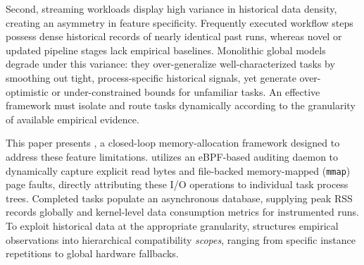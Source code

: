  


Second, streaming workloads display high variance in historical data density, creating an asymmetry in feature specificity. Frequently executed workflow steps possess dense historical records of nearly identical past runs, whereas novel or updated pipeline stages lack empirical baselines. Monolithic global models degrade under this variance: they over-generalize well-characterized tasks by smoothing out tight, process-specific historical signals, yet generate over-optimistic or under-constrained bounds for unfamiliar tasks. An effective framework must isolate and route tasks dynamically according to the granularity of available empirical evidence.

This paper presents \toolname{}, a closed-loop memory-allocation framework designed to address these feature limitations. \toolname{} utilizes an eBPF-based auditing daemon to dynamically capture explicit read bytes and file-backed memory-mapped (\texttt{mmap}) page faults, directly attributing these I/O operations to individual task process trees. 
Completed tasks populate an asynchronous database, supplying peak RSS records globally and kernel-level data consumption metrics for instrumented runs. To exploit historical data at the appropriate granularity, \toolname{} structures empirical observations into hierarchical compatibility \textit{scopes}, ranging from specific instance repetitions to global hardware fallbacks. 


